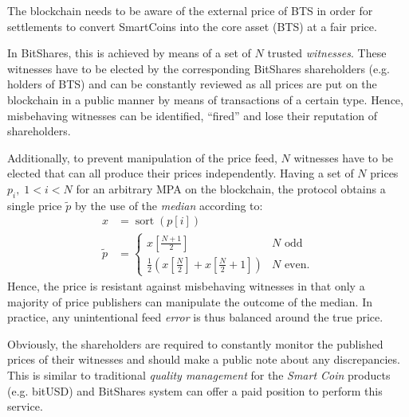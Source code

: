 \label{sec:feeds}

The blockchain needs to be aware of the external price of BTS in order for
settlements to convert SmartCoins into the core asset (BTS) at a fair price.

In BitShares, this is achieved by means of a set of $N$ trusted
\emph{witnesses}. These witnesses have to be elected by the corresponding
BitShares shareholders (e.g. holders of BTS) and can be constantly reviewed as
all prices are put on the blockchain in a public manner by means of
transactions of a certain type. Hence, misbehaving witnesses can be identified,
``fired'' and lose their reputation of shareholders.

Additionally, to prevent manipulation of the price feed, $N$ witnesses have to
be elected that can all produce their prices independently. Having a set of $N$
prices $p_i,\;1<i<N$ for an arbitrary MPA on the blockchain, the protocol
obtains a single price $\tilde{p}$ by the use of the \emph{median} according
to:
\begin{align}
 x &= \operatorname{sort}(p[i])\\
 \tilde p &=\begin{cases}
   x[\frac{N+1}{2}]                                               & N \text{ odd}\\
   \frac {1}{2}\left(x[{\frac{N}{2}}] + x[\frac{N}{2} + 1]\right) & N \text{ even.}
 \end{cases}
\end{align}
Hence, the price is resistant against misbehaving witnesses in that only a
majority of price publishers can manipulate the outcome of the median. In
practice, any unintentional feed \emph{error} is thus balanced around the true
price. %

Obviously, the shareholders are required to constantly monitor the published
prices of their witnesses and should make a public note about any
discrepancies. This is similar to traditional \emph{quality management} for the
\emph{Smart Coin} products (e.g. bitUSD) and BitShares system can offer a paid
position to perform this service.
